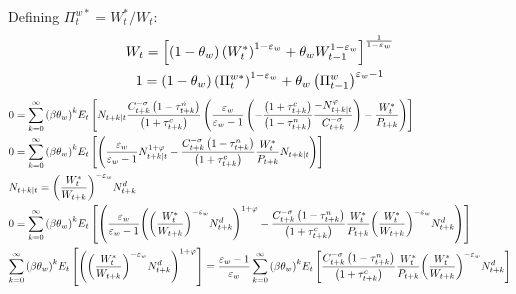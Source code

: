 \documentclass[12pt,a4paper]{article}
\begin{document}
Defining $\Pi_t^{w*}=W_t^*/W_t$:
\[\begin{gathered}
  {W_t} = {\left[ {\left( {1 - {\theta _w}} \right){{\left( {W_t^*} \right)}^{1 - {\varepsilon _w}}} + {\theta _w}W_{t - 1}^{1 - {\varepsilon _w}}} \right]^{\frac{1}{{1 - {\varepsilon _w}}}}} \hfill \\
  1={\left( {1 - {\theta _w}} \right){{\left( {\Pi_t^{w*}} \right)}^{1 - {\varepsilon _w}}} + {\theta _w}\left(\Pi_{t - 1}^w\right)^{{\varepsilon _w}-1}}
\end{gathered} \]
\[\begin{gathered}
  0 = \sum\limits_{k = 0}^\infty  {{{\left( {\beta {\theta _w}} \right)}^k}} {E_t}\left[ {{N_{t + k|t}}\frac{{C_{t + k}^{ - \sigma }\left( {1 - \tau _{t + k}^n} \right)}}{{\left( {1 + \tau _{t + k}^c} \right)}}\left( {\frac{{{\varepsilon _w}}}{{{\varepsilon _w} - 1}}\left( { - \frac{{\left( {1 + \tau _{t + k}^c} \right)}}{{\left( {1 - \tau _{t + k}^n} \right)}}\frac{{ - N_{t + k|t}^\varphi }}{{C_{t + k}^{ - \sigma }}}} \right) - \frac{{W_t^*}}{{{P_{t + k}}}}} \right)} \right] \hfill \\
  0 = \sum\limits_{k = 0}^\infty  {{{\left( {\beta {\theta _w}} \right)}^k}} {E_t}\left[ {\left( {\frac{{{\varepsilon _w}}}{{{\varepsilon _w} - 1}}N_{t + k|t}^{1 + \varphi } - \frac{{C_{t + k}^{ - \sigma }\left( {1 - \tau _{t + k}^n} \right)}}{{\left( {1 + \tau _{t + k}^c} \right)}}\frac{{W_t^*}}{{{P_{t + k}}}}{N_{t + k|t}}} \right)} \right] \hfill \\
  {N_{t + k|t}} = {\left( {\frac{{W_t^*}}{{{W_{t + k}}}}} \right)^{ - {\varepsilon _w}}}N_{t + k}^d \hfill \\
  0 = \sum\limits_{k = 0}^\infty  {{{\left( {\beta {\theta _w}} \right)}^k}} {E_t}\left[ {\left( {\frac{{{\varepsilon _w}}}{{{\varepsilon _w} - 1}}{{\left( {{{\left( {\frac{{W_t^*}}{{{W_{t + k}}}}} \right)}^{ - {\varepsilon _w}}}N_{t + k}^d} \right)}^{1 + \varphi }} - \frac{{C_{t + k}^{ - \sigma }\left( {1 - \tau _{t + k}^n} \right)}}{{\left( {1 + \tau _{t + k}^c} \right)}}\frac{{W_t^*}}{{{P_{t + k}}}}{{\left( {\frac{{W_t^*}}{{{W_{t + k}}}}} \right)}^{ - {\varepsilon _w}}}N_{t + k}^d} \right)} \right] \hfill \\
  \sum\limits_{k = 0}^\infty  {{{\left( {\beta {\theta _w}} \right)}^k}} {E_t}\left[ {{{\left( {{{\left( {\frac{{W_t^*}}{{{W_{t + k}}}}} \right)}^{ - {\varepsilon _w}}}N_{t + k}^d} \right)}^{1 + \varphi }}} \right] = \frac{{{\varepsilon _w} - 1}}{{{\varepsilon _w}}}\sum\limits_{k = 0}^\infty  {{{\left( {\beta {\theta _w}} \right)}^k}} {E_t}\left[ {\frac{{C_{t + k}^{ - \sigma }\left( {1 - \tau _{t + k}^n} \right)}}{{\left( {1 + \tau _{t + k}^c} \right)}}\frac{{W_t^*}}{{{P_{t + k}}}}{{\left( {\frac{{W_t^*}}{{{W_{t + k}}}}} \right)}^{ - {\varepsilon _w}}}N_{t + k}^d} \right] \hfill \\

\end{gathered}\]
\end{document}

